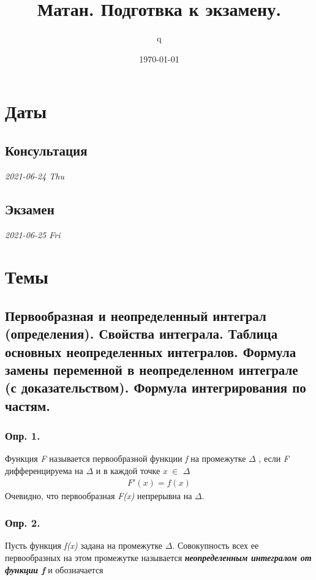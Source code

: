 \documentclass[11pt]{article}
\author{q}
\date{\today}
\title{Матан. Подготвка к экзамену.}
\begin{document}
\maketitle
\tableofcontents

\section{Даты}
\label{sec:orgd5c1067}
\subsection{Консультация}
\label{sec:org4415650}
\emph{2021-06-24 Thu}
\subsection{Экзамен}
\label{sec:org2116e8a}
\emph{2021-06-25 Fri}

\section{Темы}
\label{sec:org647bedd}
\subsection{Первообразная и неопределенный интеграл (определения). Свойства интеграла. Таблица основных неопределенных интегралов. Формула замены переменной в неопределенном интеграле (с доказательством). Формула интегрирования по частям.}
\label{sec:org38a95bb}

\subsubsection{Опр. 1.}
\label{sec:orga7ec983}
Функция \emph{F} называется первообразной функции \emph{f} на промежутке \(\Delta\) , если \emph{F} дифференцируема на \(\Delta\) и в каждой точке \emph{x} \(\in\) \(\Delta\)
\begin{eqnarray}
&&F'(x)=f(x)&&
\end{eqnarray}
Очевидно, что первообразная \emph{F(x)} непрерывна на \(\Delta\).

\subsubsection{Опр. 2.}
\label{sec:orgc3a0fc4}
Пусть функция \emph{f(x)} задана на промежутке \(\Delta\). Совокупность всех ее первообразных на этом промежутке называется \emph{\textbf{неопределенным интегралом от функции \emph{f}}} и обозначается
\end{document}
